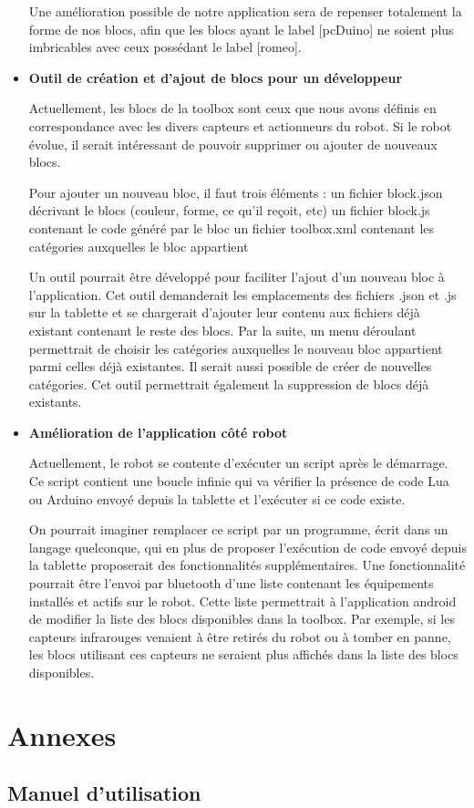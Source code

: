\documentclass[12pt,francais]{report}
\begin{document}
\begin{itemize}
Une amélioration possible de notre application sera de repenser totalement la forme de nos blocs, afin que les blocs ayant le label [pcDuino] ne soient plus imbricables avec ceux possédant le label [romeo].

\bigskip
\item \textbf{Outil de création et d'ajout de blocs pour un développeur}

Actuellement, les blocs de la toolbox sont ceux que nous avons définis en correspondance avec les divers capteurs et actionneurs du robot. Si le robot évolue, il serait intéressant de pouvoir supprimer ou ajouter de nouveaux blocs. 

Pour ajouter un nouveau bloc, il faut trois éléments :
un fichier block.json décrivant le blocs (couleur, forme, ce qu'il reçoit, etc)
un fichier block.js contenant le code généré par le bloc
un fichier toolbox.xml contenant les catégories auxquelles le bloc appartient

Un outil pourrait être développé pour faciliter l'ajout d'un nouveau bloc à l'application. Cet outil demanderait les emplacements des fichiers .json et .js sur la tablette et se chargerait d'ajouter leur contenu aux fichiers déjà existant contenant le reste des blocs. Par la suite, un menu déroulant permettrait de choisir les catégories auxquelles le nouveau bloc appartient parmi celles déjà existantes. Il serait aussi possible de créer de nouvelles catégories. Cet outil permettrait également la suppression de blocs déjà existants.

\bigskip
\item \textbf{Amélioration de l'application côté robot}

Actuellement, le robot se contente d'exécuter un script après le démarrage. Ce script contient une boucle infinie qui va vérifier la présence de code Lua ou Arduino envoyé depuis la tablette et l'exécuter si ce code existe.

On pourrait imaginer remplacer ce script par un programme, écrit dans un langage quelconque, qui en plus de proposer l'exécution de code envoyé depuis la tablette proposerait des fonctionnalités supplémentaires. Une fonctionnalité pourrait être l'envoi par bluetooth d'une liste contenant les équipements installés et actifs sur le robot. Cette liste permettrait à l'application android de modifier la liste des blocs disponibles dans la toolbox. Par exemple, si les capteurs infrarouges venaient à être retirés du robot ou à tomber en panne, les blocs utilisant ces capteurs ne seraient plus affichés dans la liste des blocs disponibles.

\end{itemize}

\chapter*{Annexes}

\section*{Manuel d'utilisation}





\end{document}
